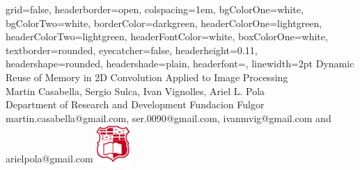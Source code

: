 \documentclass[a1paper,portrait,fontscale=0.43]{baposter}
\begin{document}

\begin{poster}
{
grid=false,
headerborder=open, %
colspacing=1em, %
bgColorOne=white, %
bgColorTwo=white, %
borderColor=darkgreen, %
headerColorOne=lightgreen, %
headerColorTwo=lightgreen, %
headerFontColor=white, %
boxColorOne=white, %
textborder=rounded, %
eyecatcher=false, %
headerheight=0.11\textheight, %
headershape=rounded, %
headershade=plain,
headerfont=\Large\textsf, %
linewidth=2pt %
}
{}
%
%
{
\textsf %
{Dynamic Reuse of Memory in 2D Convolution Applied to Image Processing
}
} %
{\sf\vspace{0.5em}\\
    Martin Casabella,
    Sergio Sulca,
    Ivan Vignolles,
    Ariel L. Pola
\vspace{0.1em}\\
\small{Department of Research and Development Fundacion Fulgor 
\vspace{0.2em}\\
martin.casabella@gmail.com, ser.0090@gmail.com,
    ivanmvig@gmail.com and arielpola@gmail.com}
}
{\includegraphics[width=0.1\textwidth]{logo}} %


\end{poster}
\end{document}
